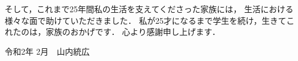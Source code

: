 \newpage
そして，これまで25年間私の生活を支えてくださった家族には，
生活における様々な面で助けていただきました．
私が25才になるまで学生を続け，生きてこれたのは，家族のおかげです．
心より感謝申し上げます．
\\

\begin{flushright}
令和2年 2月　山内統広
\end{flushright}





